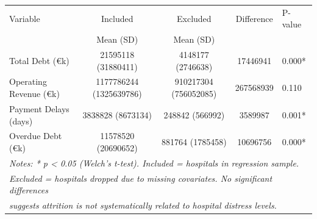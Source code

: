 \begin{tabular}{lcccp{1cm}}
\toprule
Variable & Included & Excluded & Difference & P-value \\
 & Mean (SD) & Mean (SD) & & \\
\midrule
Total Debt (€k) & 21595118 (31880411) & 4148177 (2746638) & 17446941 & 0.000* \\
Operating Revenue (€k) & 1177786244 (1325639786) & 910217304 (756052085) & 267568939 & 0.110 \\
Payment Delays (days) & 3838828 (8673134) & 248842 (566992) & 3589987 & 0.001* \\
Overdue Debt (€k) & 11578520 (20690652) & 881764 (1785458) & 10696756 & 0.000* \\
\midrule
\multicolumn{5}{l}{\textit{Notes: * p < 0.05 (Welch's t-test). Included = hospitals in regression sample.}} \\
\multicolumn{5}{l}{\textit{Excluded = hospitals dropped due to missing covariates. No significant differences}} \\
\multicolumn{5}{l}{\textit{suggests attrition is not systematically related to hospital distress levels.}} \\
\bottomrule
\end{tabular}